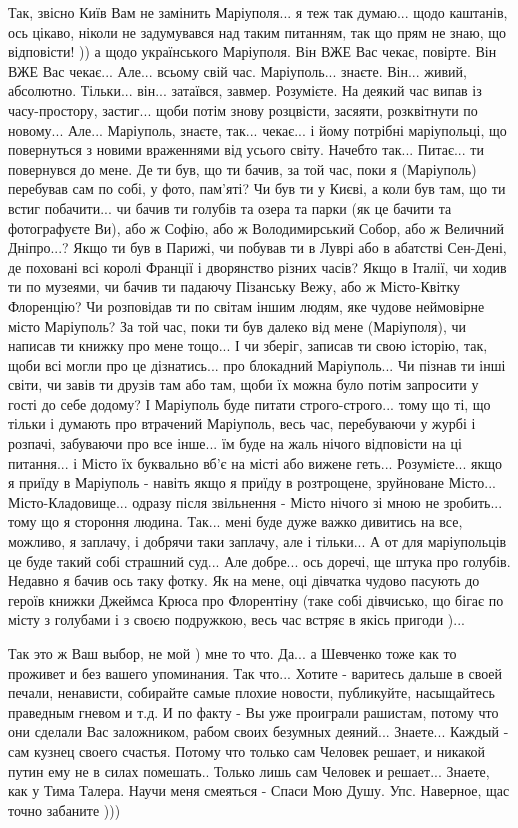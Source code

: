Так, звісно Київ Вам не замінить Маріуполя... я теж так думаю... щодо каштанів,
ось цікаво, ніколи не задумувався над таким питанням, так що прям не знаю, що
відповісти! ))  а щодо українського Маріуполя. Він ВЖЕ Вас чекає, повірте. Він
ВЖЕ Вас чекає... Але... всьому свій час. Маріуполь... знаєте. Він... живий,
абсолютно. Тільки... він... затаївся, завмер. Розумієте. На деякий час випав із
часу-простору, застиг... щоби потім знову розцвісти, засяяти, розквітнути по
новому... Але... Маріуполь, знаєте, так... чекає... і йому потрібні
маріупольці, що повернуться з новими враженнями від усього світу. Начебто
так... Питає... ти повернувся до мене. Де ти був, що ти бачив, за той час, поки
я (Маріуполь) перебував сам по собі, у фото, пам'яті? Чи був ти у Києві, а коли
був там, що ти встиг побачити... чи бачив ти голубів та озера та парки (як це
бачити та фотографуєте Ви), або ж Софію, або ж Володимирський Собор, або ж
Величний Дніпро...? Якщо ти був в Парижі, чи побував ти в Луврі або в абатстві
Сен-Дені, де поховані всі королі Франції і дворянство різних часів? Якщо в
Італії, чи ходив ти по музеями, чи бачив ти падаючу Пізанську Вежу, або ж
Місто-Квітку Флоренцію? Чи розповідав ти по світам іншим людям, яке чудове
неймовірне місто Маріуполь? За той час, поки ти був далеко від мене
(Маріуполя), чи написав ти книжку про мене тощо... І чи зберіг, записав ти свою
історію, так, щоби всі могли про це дізнатись... про блокадний Маріуполь... Чи
пізнав ти інші світи, чи завів ти друзів там або там, щоби їх можна було потім
запросити у гості до себе додому? І Маріуполь буде питати строго-строго... тому
що ті, що тільки і думають про втрачений Маріуполь, весь час, перебуваючи у
журбі і розпачі, забуваючи про все інше... їм буде на жаль нічого відповісти на
ці питання... і Місто їх буквально вб'є на місті або вижене геть...
Розумієте... якщо я приїду в Маріуполь - навіть якщо я приїду в розтрощене,
зруйноване Місто... Місто-Кладовище... одразу після звільнення - Місто нічого
зі мною не зробить... тому що я стороння людина. Так... мені буде дуже важко
дивитись на все, можливо, я заплачу, і добрячи таки заплачу, але і тільки... А
от для маріупольців це буде такий собі страшний суд... Але добре... ось доречі,
ще штука про голубів. Недавно я бачив ось таку фотку. Як на мене, оці дівчатка
чудово пасують до героїв книжки Джеймса Крюса про Флорентіну (таке собі
дівчисько, що бігає по місту з голубами і з своєю подружкою, весь час встряє в
якісь пригоди )...

Так это ж Ваш выбор, не мой ) мне то что.  Да... а Шевченко тоже как то
проживет и без вашего упоминания. Так что... Хотите - варитесь дальше в своей
печали, ненависти, собирайте самые плохие новости, публикуйте, насыщайтесь
праведным гневом и т.д. И по факту - Вы уже проиграли рашистам, потому что они
сделали Вас заложником, рабом своих безумных деяний... Знаете... Каждый - сам
кузнец своего счастья. Потому что только сам Человек решает, и никакой путин
ему не в силах помешать.. Только лишь сам Человек и решает... Знаете, как у
Тима Талера. Научи меня смеяться - Спаси Мою Душу. Упс. Наверное, щас точно
забаните )))

